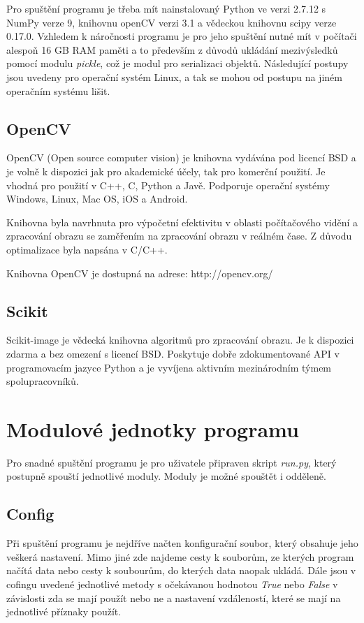 \documentclass[czech,BP]{thesiskiv}
\begin{document}
\par Pro spuštění programu je třeba mít nainstalovaný Python ve verzi 2.7.12 s NumPy verze 9, knihovnu openCV verzi 3.1 a vědeckou knihovnu scipy verze 0.17.0. Vzhledem k náročnosti programu je pro jeho spuštění nutné mít v počítači alespoň 16 GB RAM paměti a to především z důvodů ukládání mezivýsledků pomocí modulu \textit{pickle}, což je modul pro serializaci objektů. Následující postupy jsou uvedeny pro operační systém Linux, a tak se mohou od postupu na jiném operačním systému lišit.   
  
  
\subsection{OpenCV}
\par OpenCV (Open source computer vision) je knihovna vydávána pod licencí BSD a je volně k dispozici jak pro akademické účely, tak pro komerční použití. Je vhodná pro použití v C++, C, Python a Javě. Podporuje operační systémy Windows, Linux, Mac OS, iOS a Android.

\par Knihovna byla navrhnuta pro výpočetní efektivitu v oblasti počítačového vidění a zpracování obrazu se zaměřením na zpracování obrazu v reálném čase. Z důvodu optimalizace byla napsána v C/C++. 

\par Knihovna OpenCV je dostupná na adrese: http://opencv.org/

\subsection{Scikit}
\par Scikit-image je vědecká knihovna algoritmů pro zpracování obrazu. Je k dispozici zdarma a bez omezení s licencí BSD. Poskytuje dobře zdokumentované API v programovacím jazyce Python a je vyvíjena aktivním mezinárodním týmem spolupracovníků.
\cite{Scikit}

\section{Modulové jednotky programu}
Pro snadné spuštění programu je pro uživatele připraven skript \textit{run.py}, který postupně spouští jednotlivé moduly. Moduly je možné spouštět i odděleně.
\subsection{Config}
\par Při spuštění programu je nejdříve načten konfigurační soubor, který obsahuje jeho veškerá nastavení. Mimo jiné zde najdeme cesty k souborům, ze kterých program načítá data nebo cesty k soubourům, do kterých data naopak ukládá. Dále jsou v cofingu uvedené jednotlivé metody s očekávanou hodnotou \textit{True} nebo \textit{False} v závislosti zda se mají použít nebo ne a nastavení vzdáleností, které se mají na jednotlivé příznaky použít.
\end{document}
